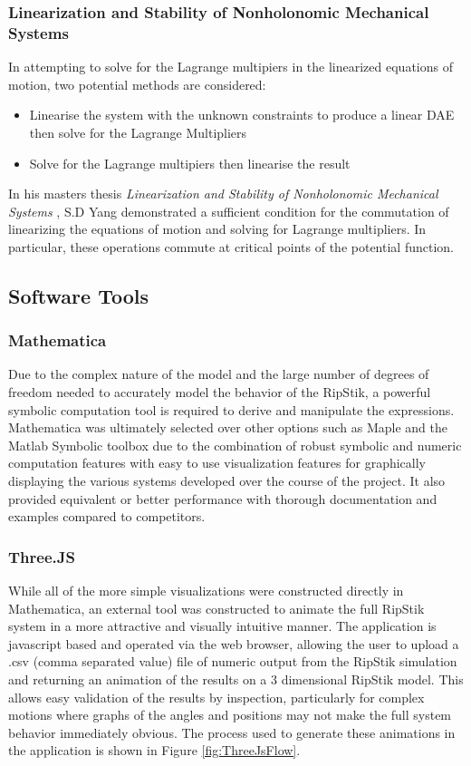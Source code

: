 \subsubsection{Linearization and Stability of Nonholonomic Mechanical Systems} \label{sec:linnonholo}
In attempting to solve for the Lagrange multipiers in the linearized equations of motion, two potential methods are considered:
\begin{itemize}
\item Linearise the system with the unknown constraints to produce a linear DAE then solve for the Lagrange Multipliers
\item Solve for the Lagrange multipiers then linearise the result
\end{itemize}
In his masters thesis \textit{Linearization and Stability of Nonholonomic Mechanical Systems} \cite{LinNonHolo}, S.D Yang demonstrated a sufficient condition for the commutation of linearizing the equations of motion and solving for Lagrange multipliers. In particular, these operations commute at critical points of the potential function\cite{LinNonHolo}.
\subsection{Software Tools}
\subsubsection{Mathematica}
Due to the complex nature of the model and the large number of degrees of freedom needed to accurately model the behavior of the RipStik, a powerful symbolic computation tool is required to derive and manipulate the expressions. 
Mathematica was ultimately selected over other options such as Maple and the Matlab Symbolic toolbox due to the combination of robust symbolic and numeric computation features with easy to use visualization features for graphically displaying the various systems developed over the course of the project.
It also provided equivalent or better performance with thorough documentation and examples compared to competitors.
\subsubsection{Three.JS}
While all of the more simple visualizations were constructed directly in Mathematica, an external tool was constructed to animate the full RipStik system in a more attractive and visually intuitive manner. 
The application is javascript based and operated via the web browser, allowing the user to upload a .csv (comma separated value) file of numeric output from the RipStik simulation and returning an animation of the results on a 3 dimensional RipStik model. 
This allows easy validation of the results by inspection, particularly for complex motions where graphs of the angles and positions may not make the full system behavior immediately obvious.
The process used to generate these animations in the application is shown in Figure \ref{fig:ThreeJsFlow}.

